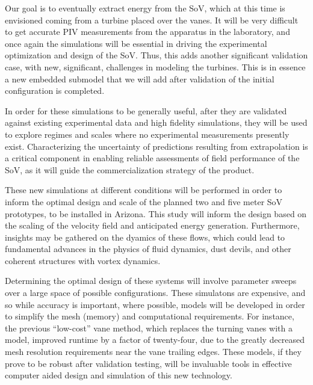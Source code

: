 Our goal is to eventually extract energy from the SoV, which at this
time is envisioned coming from a turbine placed over the vanes. It will
be very difficult to get accurate PIV measurements from the apparatus in
the laboratory, and once again the simulations will be essential in
driving the experimental optimization and design of the SoV. Thus, 
this adds another significant validation case, with new, significant,
challenges in modeling the turbines. This is in essence a new embedded
submodel that we will add after validation of the initial configuration
is completed. 

In order for these simulations to be generally useful, after they are 
validated against existing experimental data and high fidelity
simulations, they will be used to explore regimes and scales where no
experimental measurements presently exist. Characterizing the
uncertainty of predictions resulting from extrapolation is a critical
component in enabling reliable assessments of field performance of the
SoV, as it will guide the commercialization strategy of the product.

These new simulations at different conditions will be performed in order
to inform the optimal design and scale of the planned two and five meter
SoV prototypes, to be installed in Arizona. This study will inform the
design based on the scaling of the velocity field and anticipated energy
generation. Furthermore, insights may be gathered on the dyamics of
these flows, which could lead to fundamental advances in the physics of
fluid dynamics, dust devils, and other coherent structures with vortex 
dynamics\cite{Mullen1977181,smithleslie,kanak}. 

Determining the optimal design of these systems will involve parameter
sweeps over a large space of possible configurations. These simulatons
are expensive, and so while accuracy is important, where possible,
models will be developed in order to simplify the mesh (memory) and
computational requirements. For instance, the previous ``low-cost'' vane
 method, which replaces the turning
vanes with a model, improved runtime by a factor of twenty-four, due to
the greatly decreased mesh resolution requirements near the vane
trailing edges. These models, if they prove to be robust after
validation testing, will be
invaluable tools in effective computer aided design and simulation of
this new technology.  

